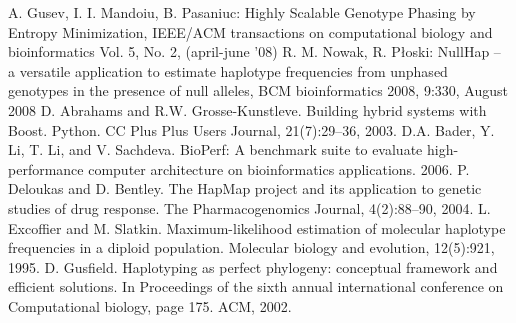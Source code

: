 \documentclass[]{spie}
\begin{document}

\begin{thebibliography}{99}

 A. Gusev, I. I. Mandoiu, B. Pasaniuc: Highly Scalable Genotype Phasing by Entropy Minimization, IEEE/ACM transactions on computational biology and bioinformatics Vol. 5, No. 2, (april-june ’08)
 R. M. Nowak, R. Płoski: NullHap – a versatile application to estimate haplotype frequencies from unphased genotypes in the presence of null alleles, BCM bioinformatics 2008, 9:330, August 2008
 D. Abrahams and R.W. Grosse-Kunstleve. Building hybrid systems with Boost. Python. CC Plus Plus Users Journal, 21(7):29–36, 2003.
 D.A. Bader, Y. Li, T. Li, and V. Sachdeva. BioPerf: A benchmark suite to evaluate high-performance computer architecture on bioinformatics applications. 2006.
 P. Deloukas and D. Bentley. The HapMap project and its application to genetic studies of drug response. The Pharmacogenomics Journal, 4(2):88–90, 2004.
 L. Excoffier and M. Slatkin. Maximum-likelihood estimation of molecular haplotype frequencies in a diploid population. Molecular biology and evolution, 12(5):921, 1995.
 D. Gusfield. Haplotyping as perfect phylogeny: conceptual framework and efficient solutions. In Proceedings of the sixth annual international conference on Computational biology, page 175. ACM, 2002.

\end{thebibliography}
\end{document}

